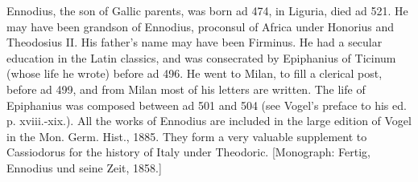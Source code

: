 Ennodius, the son of Gallic parents, was born ad 474, in Liguria, died ad 521. He may have been grandson of Ennodius, proconsul of Africa under Honorius and Theodosius II. His father\texthebrew{}’s name may have been Firminus. He had a secular education in the Latin classics, and was consecrated by Epiphanius of Ticinum (whose life he wrote) before ad 496. He went to Milan, to fill a clerical post, before ad 499, and from Milan most of his letters are written. The life of Epiphanius was composed between ad 501 and 504 (see Vogel\texthebrew{}’s preface to his ed. p. xviii.-xix.). All the works of Ennodius are included in the large edition of Vogel in the Mon. Germ. Hist., 1885. They form a very valuable supplement to Cassiodorus for the history of Italy under Theodoric. [Monograph: Fertig, Ennodius und seine Zeit, 1858.]

